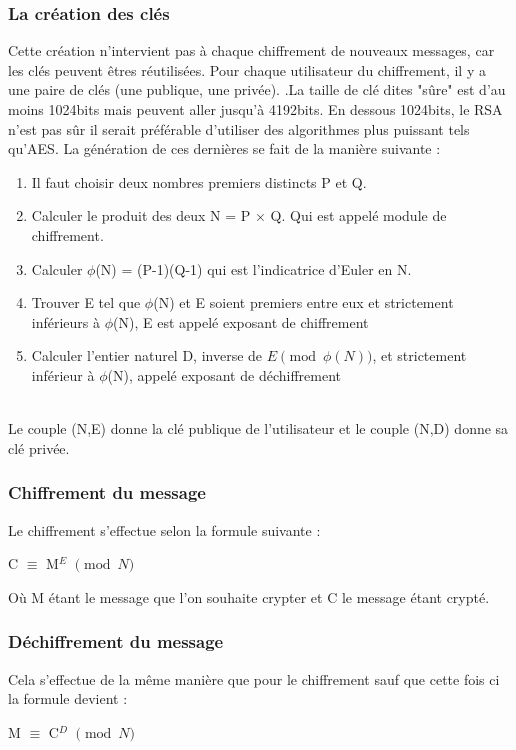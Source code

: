 \documentclass[12pt,a4paper]{report}
\begin{document}
\subsubsection{La création des clés}
Cette création n'intervient pas à chaque chiffrement de nouveaux messages, car les clés peuvent êtres réutilisées. Pour chaque utilisateur du chiffrement, il y a une paire de clés (une publique, une privée).
.La taille de clé dites "sûre" est d'au moins 1024bits mais peuvent aller jusqu'à 4192bits. En dessous 1024bits, le RSA n'est pas sûr il serait préférable d'utiliser des algorithmes plus puissant tels qu'AES. La génération de ces dernières se fait de la manière suivante :
\begin{enumerate}
    \item Il faut choisir deux nombres premiers distincts P et Q.
     \item Calculer le produit des deux N = P $\times$ Q. Qui est appelé module de chiffrement.
    \item Calculer $\phi$(N) = (P-1)(Q-1) qui est  l'indicatrice d'Euler en N.
    \item Trouver E tel que $\phi$(N) et E soient premiers entre eux et strictement inférieurs à $\phi$(N), E est appelé exposant de chiffrement 
    \item Calculer l'entier naturel D, inverse de $E\pmod{\phi(N)}$, et strictement inférieur à $\phi$(N), appelé exposant de déchiffrement
\end{enumerate}
\\
Le couple (N,E) donne la clé publique de l'utilisateur et le couple (N,D) donne sa clé privée.
\subsubsection{Chiffrement du message}
Le chiffrement s'effectue selon la formule suivante :\\
\begin{center}
C $\equiv$ M$^{E}$ $\pmod N$
\end{center}
Où M étant le message que l'on souhaite crypter et C le message étant crypté.
\subsubsection{Déchiffrement du message}
Cela s'effectue de la même manière que pour le chiffrement sauf que cette fois ci la formule devient :
\begin{center}
M $\equiv$ C$^{D}$ $\pmod N$
\end{center}
\newpage
\end{document}
